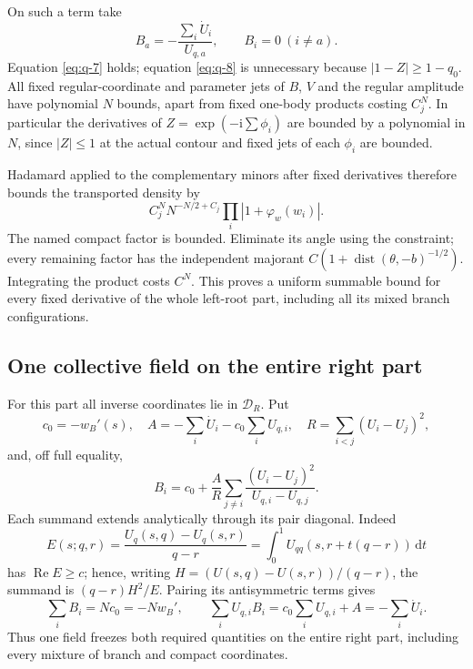 \documentclass[11pt]{article}
\numberwithin{equation}{section}
\theoremstyle{remark}\newtheorem{remark}[theorem]{Remark}
\newcommand{\ii}{\mathrm i}
\newcommand{\dd}{\mathrm d}
\newcommand{\Rea}{\operatorname{Re}}
\begin{document}
On such a term take
\begin{equation}\label{eq:q-10}
B_a=-\frac{\sum_i\dot U_i}{U_{q,a}},\qquad B_i=0\ (i\ne a).
\end{equation}
Equation \eqref{eq:q-7} holds; equation \eqref{eq:q-8} is unnecessary because
$|1-Z|\ge1-q_0$. All fixed regular-coordinate and parameter jets of
$B$, $V$ and the regular amplitude have polynomial $N$ bounds, apart
from fixed one-body products costing $C_j^N$. In particular the
derivatives of $Z=\exp(-\ii\sum\phi_i)$ are bounded by a polynomial
in $N$, since $|Z|\le1$ at the actual contour and fixed jets of each
$\phi_i$ are bounded.

Hadamard applied to the complementary minors after fixed derivatives
therefore bounds the transported density by
\begin{equation}\label{eq:q-11}
C_j^N N^{-N/2+C_j}\prod_i |1+\varphi_w(w_i)|.
\end{equation}
The named compact factor is bounded. Eliminate its angle using the
constraint; every remaining factor has the independent majorant
$C(1+\operatorname{dist}(\theta,-b)^{-1/2})$. Integrating the product
costs $C^N$. This proves a uniform summable bound for every fixed
derivative of the whole left-root part, including all its mixed
branch configurations.

\subsection{One collective field on the entire right part}\label{sec:right-field}

For this part all inverse coordinates lie in $\mathcal D_R$. Put
\[
 c_0=-w_B'(s),\quad
 A=-\sum_i\dot U_i-c_0\sum_iU_{q,i},\quad
 R=\sum_{i<j}(U_i-U_j)^2,
\]
and, off full equality,
\begin{equation}\label{eq:q-12}
B_i=c_0+\frac A R\sum_{j\ne i}
              \frac{(U_i-U_j)^2}{U_{q,i}-U_{q,j}}.
\end{equation}
Each summand extends analytically through its pair diagonal. Indeed
\[
 E(s;q,r)=\frac{U_q(s,q)-U_q(s,r)}{q-r}
         =\int_0^1U_{qq}(s,r+t(q-r))\,\dd t
\]
has $\Rea E\ge c$; hence, writing
$H=(U(s,q)-U(s,r))/(q-r)$, the summand is
$(q-r)H^2/E$. Pairing its antisymmetric terms gives
\begin{equation}\label{eq:q-13}
\sum_iB_i=Nc_0=-Nw_B',\qquad
 \sum_iU_{q,i}B_i=c_0\sum_iU_{q,i}+A=-\sum_i\dot U_i.
\end{equation}
Thus one field freezes both required quantities on the entire right
part, including every mixture of branch and compact coordinates.
\end{document}
